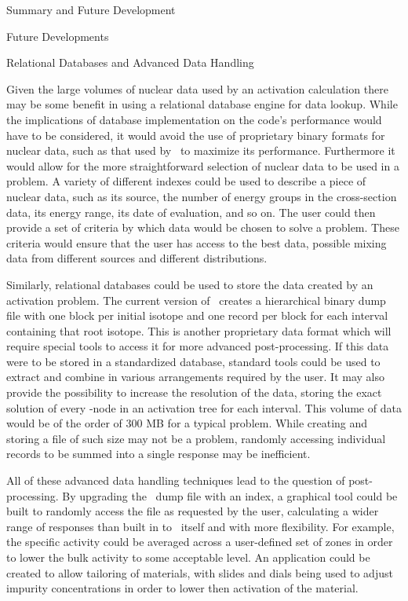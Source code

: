 \begin{chapter}{Summary and Future Development}
\begin{section}{Future Developments}
    \begin{subsection}{Relational Databases and Advanced Data Handling}
      
      Given the large volumes of nuclear data used by an activation
      calculation there may be some benefit in using a relational
      database engine for data lookup.  While the implications of
      database implementation on the code's performance would have to
      be considered, it would avoid the use of proprietary binary
      formats for nuclear data, such as that used by \ALARA\ to
      maximize its performance.  Furthermore it would allow for the
      more straightforward selection of nuclear data to be used in a
      problem.  A variety of different indexes could be used to
      describe a piece of nuclear data, such as its source, the number
      of energy groups in the cross-section data, its energy range,
      its date of evaluation, and so on.  The user could then provide
      a set of criteria by which data would be chosen to solve a
      problem.  These criteria would ensure that the user has access
      to the best data, possible mixing data from different sources
      and different distributions.
      
      Similarly, relational databases could be used to store the data
      created by an activation problem.  The current version of
      \ALARA\ creates a hierarchical binary dump file with one block
      per initial isotope and one record per block for each interval
      containing that root isotope.  This is another proprietary data
      format which will require special tools to access it for more
      advanced post-processing.  If this data were to be stored in a
      standardized database, standard tools could be used to extract
      and combine in various arrangements required by the user.  It
      may also provide the possibility to increase the resolution of
      the data, storing the exact solution of every \pc-node in an
      activation tree for each interval.  This volume of data would be
      of the order of 300 MB for a typical problem.  While creating
      and storing a file of such size may not be a problem, randomly
      accessing individual records to be summed into a single response
      may be inefficient.

      All of these advanced data handling techniques lead to the
      question of post-processing.  By upgrading the \ALARA\ dump file
      with an index, a graphical tool could be built to randomly
      access the file as requested by the user, calculating a wider
      range of responses than built in to \ALARA\ itself and with more
      flexibility.  For example, the specific activity could be
      averaged across a user-defined set of zones in order to lower
      the bulk activity to some acceptable level.  An application
      could be created to allow tailoring of materials, with slides
      and dials being used to adjust impurity concentrations in order
      to lower then activation of the material.
    \end{subsection}


\end{section}
\end{chapter}
